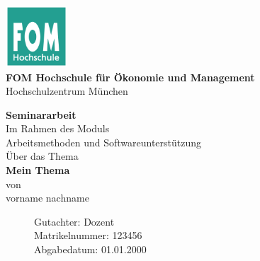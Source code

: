 \newcommand{\Thema}{Mein Thema}
\newcommand{\Name}{vorname nachname}
\newcommand{\Gutachter}{Dozent}
\newcommand{\Matrikelnummer}{123456}
\newcommand{\Abgabedatum}{01.01.2000}




\begin{titlepage}
	\begin{center}
		\includegraphics[width=2.3cm]{assets/fomLogo.pdf}\\
		\textbf{FOM Hochschule für Ökonomie und Management}\\
		\vspace{.5cm}
		Hochschulzentrum München
	\end{center}
						
	\bigskip	
																														
	\begin{center}
		\textbf{Seminararbeit}\\
		\vspace{0.2cm}
		Im Rahmen des Moduls\\
		\vspace{0.5cm}
		Arbeitsmethoden und Softwareunterstützung\\
		\vspace{2cm}
		Über das Thema\\
		\vspace{0.5cm}
		\textbf{\Thema}\\
		\vspace{0.5cm}
		von\\
		\vspace{0.5cm}
		\Name\\
	\end{center}
				
	\begin{figure}[b]
																																																																																																			                        
		Gutachter: \Gutachter       \\
		Matrikelnummer: \Matrikelnummer \\ 
		Abgabedatum: \Abgabedatum 
	\end{figure}
																																																
\end{titlepage}